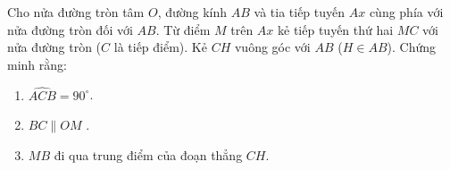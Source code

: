 \begin{ex}%
	Cho nửa đường tròn tâm $O$, đường kính $AB$ và tia tiếp tuyến $Ax$ cùng phía với nửa đường tròn đối với $AB$. Từ điểm $M$ trên $Ax$ kẻ tiếp tuyến thứ hai $MC$ với nửa đường  tròn ($C$ là tiếp điểm). Kẻ $CH$ vuông góc với $AB$ ($H \in AB$). Chứng minh rằng:
	\begin{enumerate}
		 \item $\widehat{ACB}=90^\circ$.
		 \item $BC \parallel  OM$ .
		 \item $MB$ đi qua trung điểm của đoạn thẳng $CH$.
    \end{enumerate}
\end{ex}

